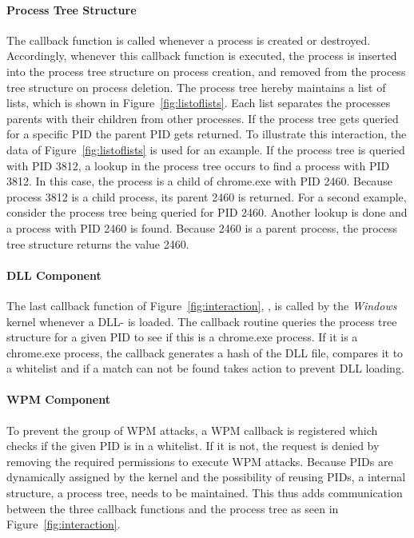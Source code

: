\paragraph{Process Tree Structure}
The  callback function is called whenever a process is created or destroyed. Accordingly, whenever this callback function is executed, the process is inserted into the process tree structure on process creation, and removed from the process tree structure on process deletion. The process tree hereby maintains a list of lists, which is shown in Figure~\ref{fig:listoflists}.
Each list separates the processes parents with their children from other processes. If the process tree gets queried for a specific \gls{PID} the parent \gls{PID} gets returned. To illustrate this interaction, the data of Figure~\ref{fig:listoflists} is used for an example. If the process tree is queried with \gls{PID} 3812, a lookup in the process tree occurs to find a process with \gls{PID} 3812. In this case, the process is a child of chrome.exe with \gls{PID} 2460.
Because process 3812 is a child process, its parent 2460 is returned. For a second example, consider the process tree being queried for \gls{PID} 2460. Another lookup is done and a process with \gls{PID} 2460 is found. Because 2460 is a parent process, the process tree structure returns the value 2460.

\paragraph{DLL Component}
The last callback function of Figure~\ref{fig:interaction}, , is called by the \emph{Windows} kernel whenever a \gls{DLL}- is loaded. The callback routine queries the process tree structure for a given \gls{PID} to see if this is a chrome.exe process. If it is a chrome.exe process, the callback generates a hash of the \gls{DLL} file, compares it to a whitelist and if a match can not be found takes action to prevent \gls{DLL} loading.

\paragraph{WPM Component}
To prevent the group of \gls{WPM} attacks, a \gls{WPM} callback is registered which checks if the given \gls{PID} is in a whitelist. If it is not, the request is denied by removing the required permissions to execute \gls{WPM} attacks. Because \glspl{PID} are dynamically assigned by the kernel and the possibility of reusing \glspl{PID}, a internal structure, a process tree, needs to be maintained. This thus adds communication between the three callback functions and the process tree as seen in Figure~\ref{fig:interaction}.